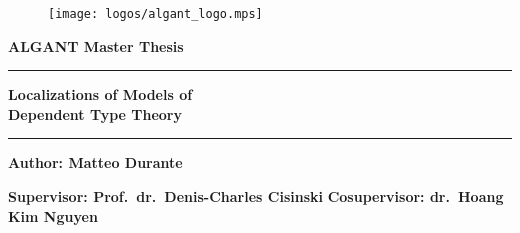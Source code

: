 \thispagestyle{empty}
\begin{titlepage}
  \begin{center}
    \begin{figure}[h!]
      \centering
      \texttt{[image: logos/algant\_logo.mps]}
    \end{figure}
    \vspace{0.4cm}
    \fontsize{15pt}{0.6cm}\selectfont
    {\textbf{ALGANT Master Thesis}}
    \vspace{0.2cm}
    \rule{\linewidth}{0.3mm}
    
    \vspace{0.05cm}
    \Huge{\textbf{Localizations of Models of
        \\ %
        Dependent Type Theory}}\\
    \vspace{0.05cm}
    
    \rule{\linewidth}{0.3mm}
    
    \vspace{1cm}
    
    \large{\textbf{Author: Matteo Durante}}\\
    \vspace{1cm}
    
    \large{\textbf{Supervisor: Prof.\ dr.\ Denis-Charles Cisinski}}
    \vspace{0.1cm}
    \large{\textbf{Cosupervisor: dr.\ Hoang Kim Nguyen}} \\
    
    \vfill
    

\end{center}
\end{titlepage}

